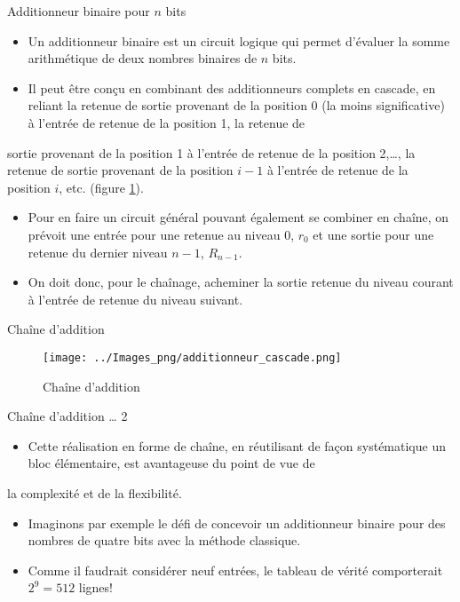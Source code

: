 \documentclass[presentation]{beamer}
\begin{document}
\begin{frame}[label={sec:org23800b3}]{Additionneur binaire pour \(n\) bits}
\begin{itemize}
\item Un additionneur binaire est un circuit logique qui permet d'évaluer la somme arithmétique de deux nombres binaires de \(n\) bits.

\item Il peut être conçu en combinant des additionneurs complets en cascade, en reliant la retenue de sortie provenant de la position 0 (la moins significative) à l'entrée de retenue de la position 1, la retenue de
\end{itemize}
sortie provenant de la position 1 à l'entrée de retenue de la position
2,\ldots{}, la retenue de sortie provenant de la position \(i-1\) à l'entrée de retenue de la position \(i\), etc. (figure \ref{fig:orge2b652e}).

\begin{itemize}
\item Pour en faire un circuit général pouvant également se combiner en chaîne, on prévoit une entrée pour une retenue au niveau 0, \(r_0\) et une sortie pour une retenue du dernier niveau \(n-1\), \(R_{n-1}\).

\item On doit donc, pour le chaînage, acheminer la sortie retenue du niveau courant à l'entrée de retenue du niveau suivant.
\end{itemize}
\end{frame}

\begin{frame}[label={sec:org824d41a}]{Chaîne d'addition}
\begin{figure}[htbp]
\centering
\texttt{[image: ../Images\_png/additionneur\_cascade.png]}
\caption{\label{fig:orge2b652e}Chaîne d'addition}
\end{figure}
\end{frame}

\begin{frame}[label={sec:orgb08ed5d}]{Chaîne d'addition \ldots{} 2}
\begin{itemize}
\item Cette réalisation en forme de chaîne, en réutilisant de façon systématique un bloc élémentaire, est avantageuse du point de vue de
\end{itemize}
la complexité et de la flexibilité.

\begin{itemize}
\item Imaginons par exemple le défi de concevoir un additionneur binaire pour des nombres de quatre bits avec la méthode classique.

\item Comme il faudrait considérer neuf entrées, le tableau de vérité comporterait \(2^9= 512\) lignes!
\end{itemize}
\end{frame}
\end{document}
